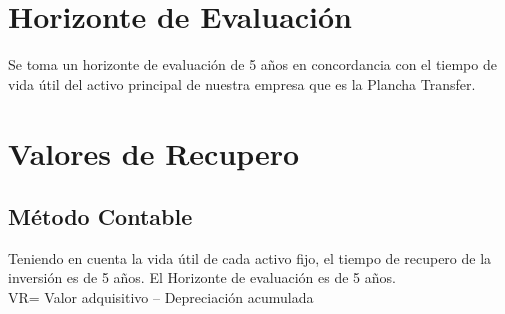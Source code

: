 \documentclass[a4paper,openright,12pt]{book}
\begin{document}
\section{Horizonte de Evaluación}

Se toma un horizonte de evaluación de 5 años en concordancia con el tiempo de vida útil del activo principal de nuestra empresa que es la Plancha Transfer.

\section{Valores de Recupero}

\subsection{Método Contable}
Teniendo en cuenta la vida útil de cada activo fijo, el tiempo de recupero de la inversión es de 5 años. El Horizonte de evaluación es de 5 años. \\
VR= Valor adquisitivo – Depreciación acumulada
\end{document}
